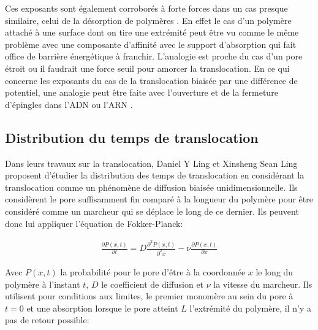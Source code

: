 
 Ces exposants sont également corroborés à forte forces dans un cas presque similaire, celui de la désorption de polymères \cite{Paturej2012}. En effet le cas d'un polymère attaché à une surface dont on tire une extrémité peut être vu comme le même problème avec une composante d'affinité avec le support d'absorption qui fait office de barrière énergétique à franchir. L'analogie est proche du cas d'un pore étroit ou il faudrait une force seuil pour amorcer la translocation. En ce qui concerne les exposants du cas de la translocation biaisée par une différence de potentiel, une analogie peut être faite avec l'ouverture et de la fermeture d'épingles dans l'ADN ou l'ARN \cite{Ferrantini2011}.


 \newpage

\subsection{Distribution du temps de translocation}

Dans leurs travaux sur la translocation, Daniel Y Ling et Xinsheng Sean Ling \cite{Ling2013} proposent d'étudier la distribution des temps de translocation en considérant la translocation comme un phénomène de diffusion biaisée unidimensionnelle. Ils considèrent le pore suffisamment fin comparé à la longueur du polymère pour être considéré comme un marcheur qui se déplace le long de ce dernier. Ils peuvent donc lui appliquer l'équation de Fokker-Planck:

\begin{eqnarray}
\frac{\partial P(x,t)}{\partial t} =   D\frac{\partial ^2 P(x,t)}{\partial ^2 x} - \nu \frac{\partial  P(x,t)}{\partial  x}
\label{equfokkerplank}
\end{eqnarray}

Avec $P(x,t)$ la probabilité pour le pore d'être à la coordonnée $x$ le long du polymère à l'instant $t$, $D$ le coefficient de diffusion et $\nu$ la vitesse du marcheur. Ils utilisent pour conditions aux limites, le premier monomère au sein du pore à $t=0$ et une absorption lorsque le pore atteint $L$ l'extrémité du polymère, il n'y a pas de retour possible:

